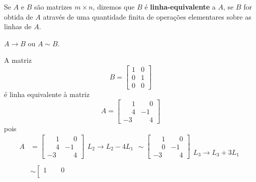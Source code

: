 \begin{definicao}
	Se $A$ e $B$ s\~ao matrizes $m \times n$, dizemos que $B$ \'e \textbf{linha-equivalente} a $A$, se $B$ for obtida de $A$ atrav\'es de uma quantidade finita de opera\c{c}\~oes elementares sobre as linhas de $A$.
\end{definicao}

\begin{notacao}
	$A \rightarrow B$ ou $A \sim B$.
\end{notacao}

\begin{exemplo}
	A matriz
	\[
		B = 
			\begin{bmatrix}
				1 & 0\\
				0 & 1\\
				0 & 0
			\end{bmatrix}
	\]
	\'e linha equivalente \`a matriz
	\[
		A =
			\begin{bmatrix}
				\phantom{-}1 & \phantom{-}0\\
				\phantom{-}4 & -1\\
				-3 & \phantom{-}4
			\end{bmatrix}
	\]
	pois
	\begin{align*}
		A &= 
			\left[
				\begin{array}{cc}
					\phantom{-}1 & \phantom{-}0\\
					\phantom{-}4 & -1\\
					-3 & \phantom{-}4
				\end{array}
			\right]
			\begin{array}{l}
				\phantom{x}\\
				L_2 \to L_2 - 4L_1\\
				\phantom{x}
			\end{array} \sim
			\left[
				\begin{array}{cc}
					\phantom{-}1 & \phantom{-}0\\
					\phantom{-}0 & -1\\
					-3 & \phantom{-}4
				\end{array}
			\right]
			\begin{array}{l}
				\phantom{x}\\
				\phantom{x}\\
				L_3 \to L_3 + 3L_1
			\end{array}\\ \\ &\sim
			\left[
				\begin{array}{cc}
					1 & \phantom{-}0\\

\end{array}
\end{align*}
\end{exemplo}
